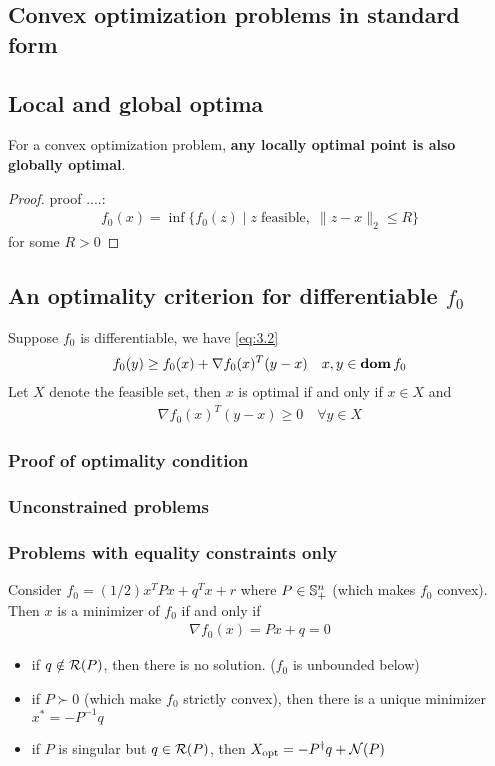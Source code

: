 \subsection{Convex optimization problems in standard form}

\subsection{Local and global optima}
For a convex optimization problem, \textbf{any locally optimal point is also globally optimal}.
\begin{proof}
  proof ....:
  \begin{align}
    f_0(x)=\inf\{f_0(z)\mid z\;\text{feasible},\;\|z-x\|_2\le R\}
  \end{align}
  for some $R>0$
\end{proof}

\subsection{An optimality criterion for differentiable $f_0$}
Suppose $f_0$ is differentiable, we have \eqref{eq:3.2}
\begin{align}
  f_0(y)\ge f_0(x)+\nabla f_0(x)^T(y-x)\quad x,y\in\mathop{\bf dom} f_0
\end{align}
Let $X$ denote the feasible set, then $x$ is optimal if and only if $x\in X$ and
\begin{align}
  \nabla f_0(x)^T(y-x)\ge 0\quad\forall y\in X
\end{align}
\subsubsection{Proof of optimality condition}
\subsubsection{Unconstrained problems}
\subsubsection{Problems with equality constraints only}
\begin{example}
  Consider $f_0=(1/2)x^TPx+q^Tx+r$ where $P\in\mathbb{S}_{+}^n$ (which makes $f_0$ convex).
  Then $x$ is a minimizer of $f_0$ if and only if
  \begin{align*}
    \nabla f_0(x)=Px+q=0
  \end{align*}
  \begin{itemize}
    \item if $q\notin{\mathcal R}(P)$, then there is no solution. ($f_0$ is unbounded below)
    \item if $P\succ 0$ (which make $f_0$ strictly convex), then there is a unique minimizer $x^\ast=-P^{-1}q$
    \item if $P$ is singular but $q\in{\mathcal R}(P)$, then $X_{\text{opt}}=-P^\dagger q+{\mathcal N}(P)$
  \end{itemize}
\end{example}
\begin{example}
\end{example}

